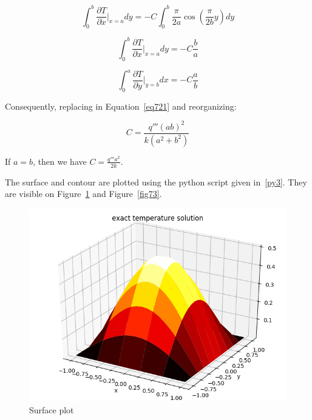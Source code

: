 \begin{equation}\label{eq724}
\int_0^b \frac{\partial T}{\partial x}\bigg\rvert_{x=a} dy = -C \int_0^b \frac{\pi}{2a}\cos \left(\frac{\pi}{2b}y \right) dy
\end{equation}

\begin{equation}\label{eq725}
\int_0^b \frac{\partial T}{\partial x}\bigg\rvert_{x=a} dy = -C \frac{b}{a}
\end{equation}


\begin{equation}\label{eq726}
\int_0^a \frac{\partial T}{\partial y}\bigg\rvert_{y=b} dx = -C \frac{a}{b}
\end{equation}

Consequently, replacing in Equation~\ref{eq721} and reorganizing:


\begin{equation}\label{eq726}
C = \frac{q'''(ab)^2}{k(a^2 + b^2)}
\end{equation}

If $a = b$, then we have $C = \frac{q'''a^2}{2k}$.

The surface and contour are plotted using the python script given in~\ref{py3}. They are visible on Figure~\ref{fig72} and Figure~\ref{fig73}.

\begin{figure}[H]
\centering
\includegraphics[scale=1]{fig/figure_1.png}
\caption{Surface plot}
\label{fig72}
\end{figure}


